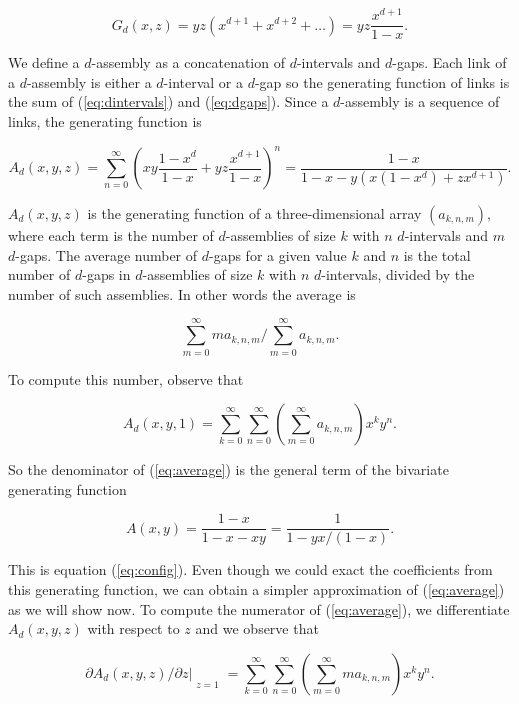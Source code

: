 \documentclass{article}
\begin{document}
\begin{equation}
\label{eq:dgaps}
G_d(x,z) = yz(x^{d+1}+x^{d+2}+\ldots) = yz\frac{x^{d+1}}{1-x}.
\end{equation}

We define a $d$-assembly as a concatenation of $d$-intervals and $d$-gaps.
Each link of a $d$-assembly is either a $d$-interval or a $d$-gap so the
generating function of links is the sum of (\ref{eq:dintervals}) and
(\ref{eq:dgaps}). Since a $d$-assembly is a sequence of links, the
generating function is

\begin{equation*}
A_d(x,y,z) = \sum_{n=0}^\infty \left(xy\frac{1-x^d}{1-x} +
yz\frac{x^{d+1}}{1-x}\right)^n =
\frac{1-x}{1-x-y\left(x(1-x^d) +zx^{d+1}\right)}.
\end{equation*}

$A_d(x,y,z)$ is the generating function of a three-dimensional array
$(a_{k,n,m})$, where each term is the number of $d$-assemblies of size $k$
with $n$ $d$-intervals and $m$ $d$-gaps. The average number of $d$-gaps
for a given value $k$ and $n$ is the total number of $d$-gaps in
$d$-assemblies of size $k$ with $n$ $d$-intervals, divided by the number
of such assemblies. In other words the average is

\begin{equation}
\label{eq:average}
\sum_{m=0}^\infty ma_{k,n,m}\Big/\sum_{m=0}^\infty a_{k,n,m}.
\end{equation}

To compute this number, observe that

\begin{equation*}
A_d(x,y,1) = \sum_{k=0}^\infty\sum_{n=0}^\infty
\left(\sum_{m=0}^\infty a_{k,n,m}\right) x^ky^n.
\end{equation*}

So the denominator of (\ref{eq:average}) is the general term of the
bivariate generating function

\begin{equation*}
A(x,y) = \frac{1-x}{1-x-xy} = \frac{1}{1-yx/(1-x)}.
\end{equation*}

This is equation (\ref{eq:config}). Even though we could exact the
coefficients from this generating function, we can obtain a simpler
approximation of (\ref{eq:average}) as we will show now.  To compute the
numerator of (\ref{eq:average}), we differentiate $A_d(x,y,z)$ with
respect to $z$ and we observe that

\begin{equation*}
\partial A_d(x,y,z)/\partial z\Bigr|_{\substack{\\z=1}} =
\sum_{k=0}^\infty\sum_{n=0}^\infty
\left(\sum_{m=0}^\infty ma_{k,n,m}\right) x^ky^n.
\end{equation*}
\end{document}
